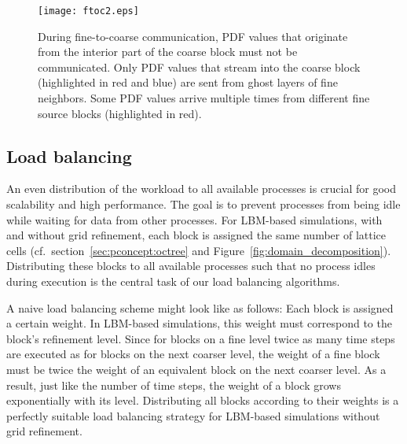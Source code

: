 \documentclass[final,leqno,onefignum,onetabnum]{siamltex1213}
\begin{document}
\begin{figure}[tbp]
  \centering
  \texttt{[image: ftoc2.eps]}
  \caption{During fine-to-coarse communication, PDF values that originate from the interior part of the coarse block must not be communicated.
Only PDF values that stream into the coarse block (highlighted in red and blue) are sent from ghost layers of fine neighbors.
Some PDF values arrive multiple times from different fine source blocks (highlighted in red).}
  \label{fig:fine_to_coarse_1}
\end{figure}

\subsection{Load balancing}\label{sec:lbmref:load}

An even distribution of the workload to all available processes is crucial for good scalability and high performance.
The goal is to prevent processes from being idle while waiting for data from other processes.
For LBM-based simulations, with and without grid refinement,
each block is assigned the same number of lattice cells (cf.\ section~\ref{sec:pconcept:octree} and Figure~\ref{fig:domain_decomposition}).
Distributing these blocks to all available processes such that no process idles during execution is the central task of our load balancing algorithms.

A naive load balancing scheme might look like as follows: Each block is assigned a certain weight.
In LBM-based simulations, this weight must correspond to the block's refinement level.
Since for blocks on a fine level twice as many time steps are executed as for blocks on the next coarser level, 
the weight of a fine block must be twice the weight of an equivalent block on the next coarser level.
As a result, just like the number of time steps, the weight of a block grows exponentially with its level.
Distributing all blocks according to their weights is a perfectly suitable load balancing strategy for LBM-based simulations without grid refinement.
\end{document}
